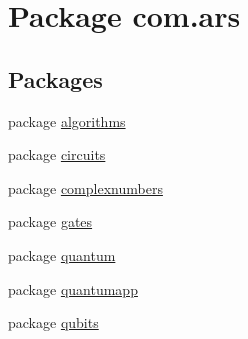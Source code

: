 \hypertarget{namespacecom_1_1ars}{}\section{Package com.\+ars}
\label{namespacecom_1_1ars}
\subsection*{Packages}
\begin{DoxyCompactItemize}
\item 
package \hyperlink{namespacecom_1_1ars_1_1algorithms}{algorithms}
\item 
package \hyperlink{namespacecom_1_1ars_1_1circuits}{circuits}
\item 
package \hyperlink{namespacecom_1_1ars_1_1complexnumbers}{complexnumbers}
\item 
package \hyperlink{namespacecom_1_1ars_1_1gates}{gates}
\item 
package \hyperlink{namespacecom_1_1ars_1_1quantum}{quantum}
\item 
package \hyperlink{namespacecom_1_1ars_1_1quantumapp}{quantumapp}
\item 
package \hyperlink{namespacecom_1_1ars_1_1qubits}{qubits}
\end{DoxyCompactItemize}
